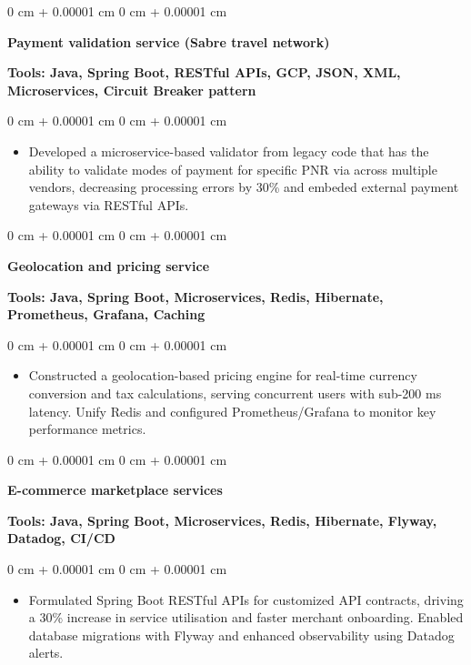 \documentclass[10pt, letterpaper]{article}
\newenvironment{highlights}{
    \begin{itemize}[
        topsep=0.10 cm,
        parsep=0.10 cm,
        partopsep=0pt,
        itemsep=0pt,
        leftmargin=0 cm + 10pt
    ]
}{
    \end{itemize}
} %
\newenvironment{onecolentry}{
    \begin{adjustwidth}{
        0 cm + 0.00001 cm
    }{
        0 cm + 0.00001 cm
    }
}{
    \end{adjustwidth}
} %
\begin{document}
        \vspace{0.1 cm}
        \begin{onecolentry}
            \textbf{Payment validation service (Sabre travel network)}
        \end{onecolentry}
        \textbf{Tools: Java, Spring Boot, RESTful APIs, GCP, JSON, XML, Microservices, Circuit Breaker pattern}
        
        \vspace{0.10 cm}
        \begin{onecolentry}
            \begin{highlights}
                \item Developed a microservice-based validator from legacy code that has the ability to validate modes of payment for specific PNR via across multiple vendors, decreasing processing errors by 30\% and embeded external payment gateways via RESTful APIs.
            \end{highlights}
        \end{onecolentry}
        
        \vspace{0.1 cm}
        \begin{onecolentry}
            \textbf{Geolocation and pricing service}
        \end{onecolentry}
        \textbf{Tools: Java, Spring Boot, Microservices, Redis, Hibernate, Prometheus, Grafana, Caching}
        \vspace{0.10 cm}
        \begin{onecolentry}
            \begin{highlights}
                \item Constructed a geolocation-based pricing engine for real-time currency conversion and tax calculations, serving concurrent users with sub-200 ms latency. Unify Redis and configured Prometheus/Grafana to monitor key performance metrics.
            \end{highlights}
        \end{onecolentry}

        \vspace{0.1 cm}

        \begin{onecolentry}
            \textbf{E-commerce marketplace services}
        \end{onecolentry}
        \textbf{Tools: Java, Spring Boot, Microservices, Redis, Hibernate, Flyway, Datadog, CI/CD}
        \vspace{0.10 cm}
        \begin{onecolentry}
            \begin{highlights}
                \item Formulated Spring Boot RESTful APIs for customized API contracts, driving a 30\% increase in service utilisation and faster merchant onboarding. Enabled database migrations with Flyway and enhanced observability using Datadog alerts.
                
            \end{highlights}
        \end{onecolentry}
    
\end{document}
